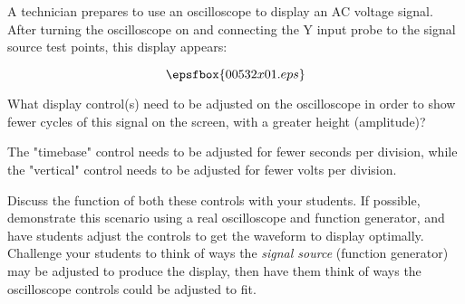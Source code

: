 

A technician prepares to use an oscilloscope to display an AC voltage signal.  After turning the oscilloscope on and connecting the Y input probe to the signal source test points, this display appears:

$$\epsfbox{00532x01.eps}$$

What display control(s) need to be adjusted on the oscilloscope in order to show fewer cycles of this signal on the screen, with a greater height (amplitude)?







The "timebase" control needs to be adjusted for fewer seconds per division, while the "vertical" control needs to be adjusted for fewer volts per division.







Discuss the function of both these controls with your students.  If possible, demonstrate this scenario using a real oscilloscope and function generator, and have students adjust the controls to get the waveform to display optimally.  Challenge your students to think of ways the {\it signal source} (function generator) may be adjusted to produce the display, then have them think of ways the oscilloscope controls could be adjusted to fit.




